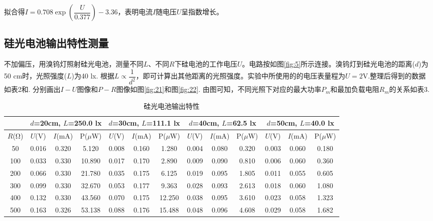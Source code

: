 \documentclass[11pt]{article}
\begin{document}
拟合得$ I=0.708\exp\left( \dfrac{U}{0.377}\right)-3.36  $，表明电流$ I $随电压$ U $呈指数增长。
\subsection{硅光电池输出特性测量}
不加偏压，用溴钨灯照射硅光电池，测量不同$  L  $、不同$  R $下硅电池的工作电压$ U $。电路按如图\ref{fig:5}所示连接。溴钨灯到硅光电池的距离($ d $)为50 cm时，光照强度($ L $)为40 lx. 根据$ L \propto \dfrac{1}{d^2}  $，即可计算出其他距离的光照强度。实验中所使用的的电压表量程为$ U=2\text{V} $.整理后得到的数据如表2和. 分别画出$ I-U $图像和$ P-R $图像如图\ref{fig:21}和图\ref{fig:22}. 由图可知，不同光照下对应的最大功率$ P_m $和最加负载电阻$ R_m $的关系如表3.
\begin{table}[htbp]\small
	\label{table3}
	\caption{硅光电池输出特性}
	\begin{tabular}{ccccccccccccc}
		\toprule
		& \multicolumn{3}{c}{$ d $=20cm, $ L $=250.0 lx} & \multicolumn{3}{c}{$ d $=30cm, $ L $=111.1 lx} & \multicolumn{3}{c}{$ d $=40cm, $ L $=62.5 lx} & \multicolumn{3}{c}{$ d $=50cm, $ L $=40.0 lx} \\ \midrule
		$ R $(Ω)      & $ U $(V)          & $ I $(mA)      & P($ \mu $W)        & $ U $(V)          & $ I $(mA)       & P($ \mu $W)        & $ U $(V)          & $ I $(mA)       & P($ \mu $W)       & $ U $(V)         & $ I $(mA)      & P($ \mu $W)      \\ \midrule
		50     & 0.016      & 0.320      & 5.120       & 0.008       & 0.160      & 1.280       & 0.004      & 0.080      & 0.320      & 0.003     & 0.060     & 0.180      \\
		100    & 0.033      & 0.330      & 10.890      & 0.017       & 0.170      & 2.890       & 0.009      & 0.090      & 0.810      & 0.006     & 0.060     & 0.360      \\
		200    & 0.066      & 0.330      & 21.780      & 0.035       & 0.175      & 6.125       & 0.019      & 0.095      & 1.805      & 0.011     & 0.055     & 0.605      \\
		300    & 0.099      & 0.330      & 32.670      & 0.053       & 0.177      & 9.363       & 0.028      & 0.093      & 2.613      & 0.018     & 0.060     & 1.080      \\
		400    & 0.132      & 0.330      & 43.560      & 0.070       & 0.175      & 12.250      & 0.038      & 0.095      & 3.610      & 0.023     & 0.058     & 1.323      \\
		500    & 0.163      & 0.326      & 53.138      & 0.088       & 0.176      & 15.488      & 0.048      & 0.096      & 4.608      & 0.029     & 0.058     & 1.682      \\

\end{tabular}
\end{table}
\end{document}
